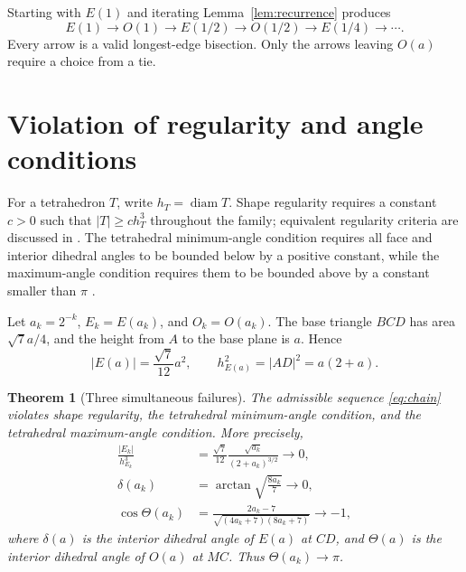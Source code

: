 \documentclass[10pt]{article}
\newtheorem{theorem}{Theorem}[section]
\theoremstyle{definition}
\DeclareMathOperator{\diam}{diam}
\begin{document}
Starting with $E(1)$ and iterating Lemma~\ref{lem:recurrence} produces
\begin{equation}\label{eq:chain}
E(1)\longrightarrow O(1)\longrightarrow E(1/2)\longrightarrow O(1/2)
\longrightarrow E(1/4)\longrightarrow\cdots.
\end{equation}
Every arrow is a valid longest-edge bisection.  Only the arrows leaving $O(a)$ require a choice from a tie.

\section{Violation of regularity and angle conditions}

For a tetrahedron $T$, write $h_T=\diam T$.  Shape regularity requires a constant $c>0$ such that $|T|\geq c h_T^3$ throughout the family; equivalent regularity criteria are discussed in \cite{BrandtsKorotovKrizek2008}.  The tetrahedral minimum-angle condition requires all face and interior dihedral angles to be bounded below by a positive constant, while the maximum-angle condition requires them to be bounded above by a constant smaller than $\pi$ \cite{Krizek1992,KorotovVatne2020,KorotovKrizek2024}.

Let $a_k=2^{-k}$, $E_k=E(a_k)$, and $O_k=O(a_k)$.  The base triangle $BCD$ has area $\sqrt7a/4$, and the height from $A$ to the base plane is $a$.  Hence
\begin{equation}\label{eq:volume}
|E(a)|=\frac{\sqrt7}{12}a^2,
\qquad
h_{E(a)}^2=|AD|^2=a(2+a).
\end{equation}

\begin{theorem}[Three simultaneous failures]\label{thm:failure}
The admissible sequence \eqref{eq:chain} violates shape regularity, the tetrahedral minimum-angle condition, and the tetrahedral maximum-angle condition.  More precisely,
\begin{align}
\frac{|E_k|}{h_{E_k}^3}
&=\frac{\sqrt7}{12}\frac{\sqrt{a_k}}{(2+a_k)^{3/2}}
\longrightarrow0, \label{eq:regfail}\\
\delta(a_k)
&=\arctan\sqrt{\frac{8a_k}{7}}
\longrightarrow0, \label{eq:minfail}\\
\cos\Theta(a_k)
&=\frac{2a_k-7}{\sqrt{(4a_k+7)(8a_k+7)}}
\longrightarrow-1, \label{eq:maxfail}
\end{align}
where $\delta(a)$ is the interior dihedral angle of $E(a)$ at $CD$, and $\Theta(a)$ is the interior dihedral angle of $O(a)$ at $MC$.  Thus $\Theta(a_k)\to\pi$.
\end{theorem}
\end{document}
